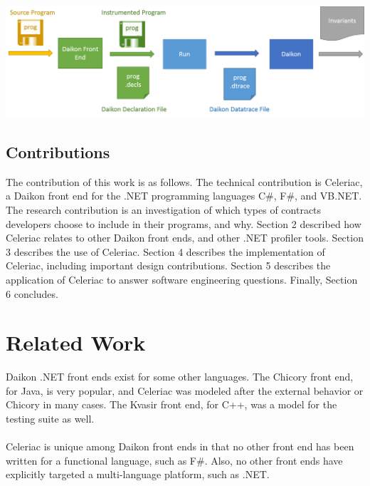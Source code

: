 \documentclass{article}
\begin{document}
\begin{center}
\includegraphics[scale=.5]{daikon}
\end{center} 

\subsection{Contributions}
The contribution of this work is as follows. The technical contribution is Celeriac, a Daikon front end for the .NET programming languages C\#, F\#, and VB.NET. The research contribution is an investigation of which types of contracts developers choose to include in their programs, and why. Section 2 described how Celeriac relates to other Daikon front ends, and other .NET profiler tools. Section 3 describes the use of Celeriac. Section 4 describes the implementation of Celeriac, including important design contributions. Section 5 describes the application of Celeriac to answer software engineering questions. Finally, Section 6 concludes.

\section{Related Work}
Daikon .NET front ends exist for some other languages. The Chicory front end, for Java, is very popular, and Celeriac was modeled after the external behavior or Chicory in many cases. The Kvasir front end, for C++, was a model for the testing suite as well.
\\ \\
Celeriac is unique among Daikon front ends in that no other front end has been written for a functional language, such as F\#. Also, no other front ends have explicitly targeted a multi-language platform, such as .NET.

\newpage
\end{document}
